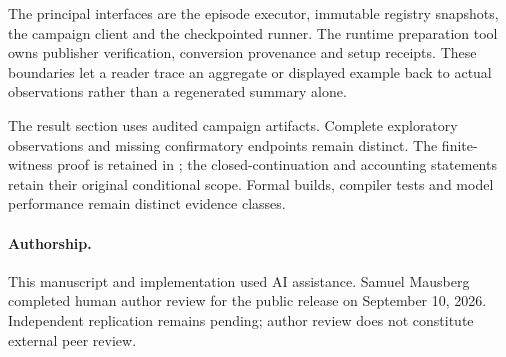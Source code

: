 \documentclass[10pt,twocolumn]{article}
\begin{document}
The principal interfaces are the episode executor, immutable registry snapshots,
the campaign client and the checkpointed runner. The runtime preparation tool
owns publisher verification, conversion provenance and setup receipts. These
boundaries let a reader trace an aggregate or displayed example back to actual
observations rather than a regenerated summary alone.

The result section uses audited campaign artifacts. Complete exploratory
observations and missing confirmatory endpoints remain distinct. The finite-witness proof is retained
in ; the closed-continuation and
accounting statements retain their original conditional scope. Formal builds,
compiler tests and model performance remain distinct evidence classes.

\paragraph{Authorship.}
This manuscript and implementation used AI assistance. Samuel Mausberg
completed human author review for the public release on September 10, 2026.
Independent replication remains pending; author review does not constitute
external peer review.
{\small}
\end{document}
